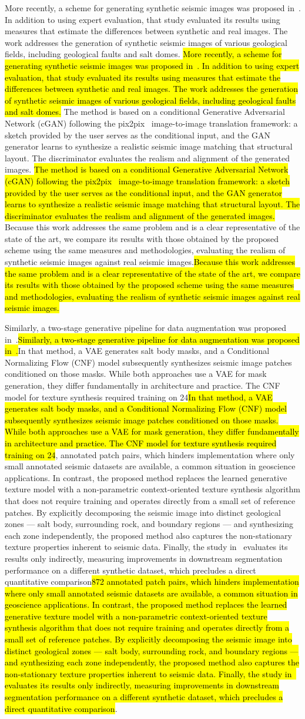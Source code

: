 \documentclass{ieeeaccess}
\makeatletter
\DeclareRobustCommand{\DIFaddbegin}{\DIFOaddbegin \let\includegraphics\DIFaddincludegraphics} %
\DeclareRobustCommand{\DIFaddend}{\DIFOaddend \let\includegraphics\DIFOincludegraphics} %
\DeclareRobustCommand{\DIFdelbegin}{\DIFOdelbegin \let\includegraphics\DIFdelincludegraphics} %
\DeclareRobustCommand{\DIFdelend}{\DIFOaddend \let\includegraphics\DIFOincludegraphics} %
\let\sout@orig\sout %
\renewcommand{\sout}[1]{\ifmmode\text{\sout@orig{\ensuremath{#1}}}\else\sout@orig{#1}\fi} %
\providecommand{\DIFadd}[1]{{\protect\color{blue}#1}}
\providecommand{\DIFdel}[1]{{\protect\color{red}\sout{#1}}}
\renewcommand{\DIFadd}[1]{\ifmmode#1\else\begingroup\let\protect\relax\hl{#1}\endgroup\fi}
\renewcommand{\DIFdel}[1]{}
\providecommand{\DIFaddbegin}{}
\providecommand{\DIFaddend}{}
\providecommand{\DIFdelbegin}{}
\providecommand{\DIFdelend}{}
\renewcommand{\DIFaddbegin}{}
\renewcommand{\DIFaddend}{}
\renewcommand{\DIFdelbegin}{}
\renewcommand{\DIFdelend}{}
\makeatother
\begin{document}
\DIFaddbegin \DIFadd{More recently, a scheme for generating synthetic seismic images was proposed in~\cite{Ferreira2020}. In addition to using expert evaluation, that study evaluated its results using measures that estimate the differences between synthetic and real images. The work addresses the generation of synthetic seismic images of various geological fields, including geological faults and salt domes. }\DIFaddend \DIFaddbegin \DIFadd{The method is based on a conditional Generative Adversarial Network (cGAN) following the pix2pix~\cite{pix2pix2017} image-to-image translation framework: a sketch provided by the user serves as the conditional input, and the GAN generator learns to synthesize a realistic seismic image matching that structural layout. The discriminator evaluates the realism and alignment of the generated images. }\DIFaddend \DIFaddbegin \DIFadd{Because this work addresses the same problem and is a clear representative of the state of the art, we compare its results with those obtained by the proposed scheme using the same measures and methodologies, evaluating the realism of synthetic seismic images against real seismic images.}\DIFaddend

\DIFaddbegin \DIFadd{Similarly, a two-stage generative pipeline for data augmentation was proposed in~\cite{Henriques2021}.}\DIFaddend \DIFdelbegin \DIFdel{very similar data augmentationmethod based on training two generative models to augment the number of samples in a seismic image dataset for the semantic segmentation of salt bodies. However, they perform an indirect evaluation of results }\DIFdelend \DIFaddbegin \DIFadd{In that method, a VAE generates salt body masks, and a Conditional Normalizing Flow (CNF) model subsequently synthesizes seismic image patches conditioned on those masks. While both approaches use a VAE for mask generation, they differ fundamentally in architecture and practice. The CNF model for texture synthesis required training on 24}\DIFaddend ,\DIFdelbegin \DIFdel{based on the improvement in the performance of segmentation methods based on convolutional neural networks, which could be difficult to use as a direct comparison of results with our proposed method and on a different database}\DIFdelend \DIFaddbegin \DIFadd{872 annotated patch pairs, which hinders implementation where only small annotated seismic datasets are available, a common situation in geoscience applications. In contrast, the proposed method replaces the learned generative texture model with a non-parametric context-oriented texture synthesis algorithm that does not require training and operates directly from a small set of reference patches. By explicitly decomposing the seismic image into distinct geological zones --- salt body, surrounding rock, and boundary regions --- and synthesizing each zone independently, the proposed method also captures the non-stationary texture properties inherent to seismic data. Finally, the study in~\cite{Henriques2021} evaluates its results only indirectly, measuring improvements in downstream segmentation performance on a different synthetic dataset, which precludes a direct quantitative comparison}\DIFaddend .
\end{document}
